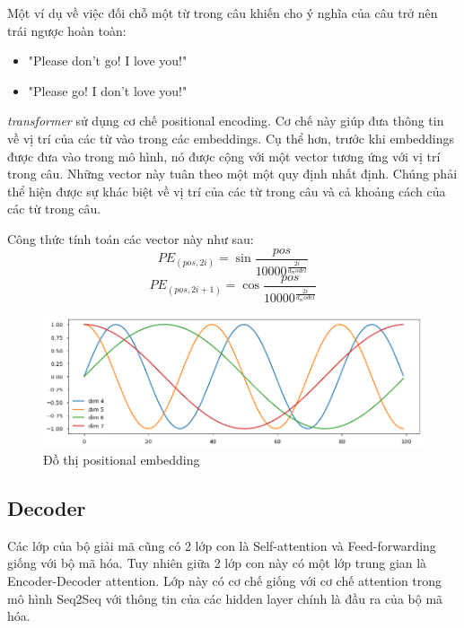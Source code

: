 Một ví dụ về việc đối chỗ một từ trong câu khiến cho ý nghĩa của câu trở nên trái ngược hoàn toàn:
\begin{itemize}
	\item "Please don't go! I love you!"
	\item "Please go! I don't love you!"
\end{itemize}

 \textit{transformer}  sử dụng cơ chế positional encoding. Cơ chế này giúp đưa thông tin về vị trí của các từ vào trong các embeddings. Cụ thể hơn, trước khi embeddings được đưa vào trong mô hình, nó được cộng với một vector tương ứng với vị trí trong câu. Những vector này tuân theo một một quy định nhất định. Chúng phải thể hiện được sự khác biệt về vị trí của các từ trong câu và cả khoảng cách của các từ trong câu. 

Công thức tính toán các vector này như sau: 
\begin{equation*}
	PE_{(pos, 2i)} = \sin{\frac{pos}{10000^{\frac{2i}{d_model}}}}
\end{equation*}
\begin{equation*}
	PE_{(pos, 2i+1)} = \cos{\frac{pos}{10000^{\frac{2i}{d_model}}}}
\end{equation*}

\begin{figure}[H]
    \begin{center}
        \includegraphics[scale=0.5]{images/positional-embedding}
        \caption{Đồ thị positional embedding}
        \label{fig:positional embedding}
    \end{center}
\end{figure}



\subsection{Decoder}
Các lớp của bộ giải mã cũng có 2 lớp con là Self-attention và Feed-forwarding giống với bộ mã hóa. Tuy nhiên giữa 2 lớp con này có một lớp trung gian là Encoder-Decoder attention. Lớp này có cơ chế giống với cơ chế attention trong mô hình Seq2Seq với thông tin của các hidden layer chính là đầu ra của bộ mã hóa.

